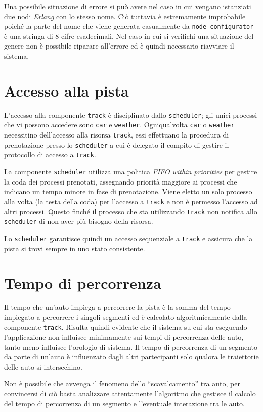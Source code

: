 \documentclass[11pt,a4paper]{report}
\newcommand{\Erlang}{\textsl{Erlang}}
\begin{document}
Una possibile situazione di errore si può avere nel caso in cui vengano istanziati due nodi \Erlang{} con lo stesso nome. Ciò tuttavia è estremamente improbabile poiché la parte del nome che viene generata casualmente da \texttt{node\_configurator} è una stringa di 8 cifre esadecimali. Nel caso in cui si verifichi una situazione del genere non è possibile riparare all'errore ed è quindi necessario riavviare il sistema.

\section{Accesso alla pista}
L'accesso alla componente \texttt{track} è disciplinato dallo \texttt{scheduler}; gli unici processi che vi possono accedere sono \texttt{car} e \texttt{weather}. Ogniqualvolta \texttt{car} o \texttt{weather} necessitino dell'accesso alla risorsa \texttt{track}, essi effettuano la procedura di prenotazione presso lo \texttt{scheduler} a cui è delegato il compito di gestire il protocollo di accesso a \texttt{track}.

La componente \texttt{scheduler} utilizza una politica \textit{FIFO within priorities} per gestire la coda dei processi prenotati, assegnando priorità maggiore ai processi che indicano un tempo minore in fase di prenotazione. Viene eletto un solo processo alla volta (la testa della coda) per l'accesso a \texttt{track} e non è permesso l'accesso ad altri processi. Questo finché il processo che sta utilizzando \texttt{track} non notifica allo \texttt{scheduler} di non aver più bisogno della risorsa.

Lo \texttt{scheduler} garantisce quindi un accesso sequenziale a \texttt{track} e assicura che la pista si trovi sempre in uno stato consistente.

\section{Tempo di percorrenza}
Il tempo che un'auto impiega a percorrere la pista è la somma del tempo impiegato a percorrere i singoli segmenti ed è calcolato algoritmicamente dalla componente \texttt{track}. Risulta quindi evidente che il sistema su cui sta eseguendo l'applicazione non influisce minimamente sui tempi di percorrenza delle auto, tanto meno influisce l'orologio di sistema. Il tempo di percorrenza di un segmento da parte di un'auto è influenzato dagli altri partecipanti solo qualora le traiettorie delle auto si intersechino.

Non è possibile che avvenga il fenomeno dello ``scavalcamento'' tra auto, per convincersi di ciò basta analizzare attentamente l'algoritmo che gestisce il calcolo del tempo di percorrenza di un segmento e l'eventuale interazione tra le auto.
\end{document}
